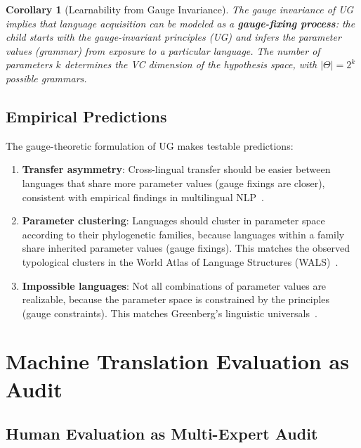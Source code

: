 \documentclass[12pt,a4paper]{article}
\newtheorem{corollary}[theorem]{Corollary}
\theoremstyle{remark}
\begin{document}
\begin{corollary}[Learnability from Gauge Invariance]
\label{cor:learnability}
The gauge invariance of UG implies that language acquisition can be
modeled as a \textbf{gauge-fixing process}: the child starts with
the gauge-invariant principles (UG) and infers the parameter values
(grammar) from exposure to a particular language. The number of
parameters $k$ determines the VC dimension of the hypothesis space,
with $|\Theta| = 2^k$ possible grammars.
\end{corollary}

\subsection{Empirical Predictions}

The gauge-theoretic formulation of UG makes testable predictions:

\begin{enumerate}[leftmargin=*, label=(\arabic*)]
  \item \textbf{Transfer asymmetry}: Cross-lingual transfer should be
        easier between languages that share more parameter values
        (gauge fixings are closer), consistent with empirical findings
        in multilingual NLP~\cite{pires2019multilingual,wu2024bilingual}.
  \item \textbf{Parameter clustering}: Languages should cluster in
        parameter space according to their phylogenetic families,
        because languages within a family share inherited parameter
        values (gauge fixings). This matches the observed typological
        clusters in the World Atlas of Language Structures
        (WALS)~\cite{dryer2013wals}.
  \item \textbf{Impossible languages}: Not all combinations of
        parameter values are realizable, because the parameter
        space is constrained by the principles (gauge constraints).
        This matches Greenberg's linguistic universals~\cite{greenberg1963universals}.
\end{enumerate}


\section{Machine Translation Evaluation as Audit}
\label{sec:evaluation_audit}

\subsection{Human Evaluation as Multi-Expert Audit}
\end{document}
